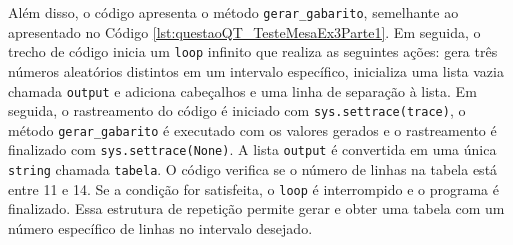 Além disso, o código apresenta o método \verb|gerar_gabarito|, semelhante ao apresentado no Código \ref{lst:questaoQT_TesteMesaEx3Parte1}.
%
Em seguida, o trecho de código inicia um \verb|loop| infinito que realiza as seguintes ações: gera três números aleatórios distintos em um intervalo específico, inicializa uma lista vazia chamada \verb|output| e adiciona cabeçalhos e uma linha de separação à lista. Em seguida, o rastreamento do código é iniciado com \verb|sys.settrace(trace)|, o método \verb|gerar_gabarito| é executado com os valores gerados e o rastreamento é finalizado com \verb|sys.settrace(None)|. A lista \verb|output| é convertida em uma única \verb|string| chamada \verb|tabela|. O código verifica se o número de linhas na tabela está entre 11 e 14. Se a condição for satisfeita, o \verb|loop| é interrompido e o programa é finalizado. Essa estrutura de repetição permite gerar e obter uma tabela com um número específico de linhas no intervalo desejado.


